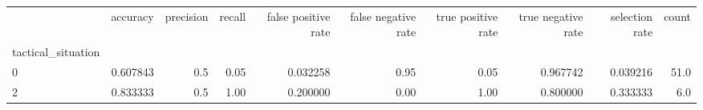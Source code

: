 \begin{tabular}{lrrrrrrrrr}
\toprule
{} &  accuracy &  precision &  recall &  false positive rate &  false negative rate &  true positive rate &  true negative rate &  selection rate &  count \\
tactical\_situation &           &            &         &                      &                      &                     &                     &                 &        \\
\midrule
0                  &  0.607843 &        0.5 &    0.05 &             0.032258 &                 0.95 &                0.05 &            0.967742 &        0.039216 &   51.0 \\
2                  &  0.833333 &        0.5 &    1.00 &             0.200000 &                 0.00 &                1.00 &            0.800000 &        0.333333 &    6.0 \\
\bottomrule
\end{tabular}
